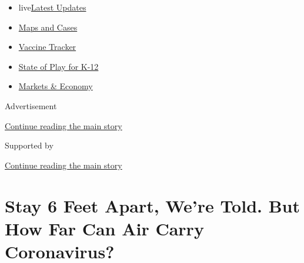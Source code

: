 \begin{itemize}
\tightlist
\item
  live\href{https://www.nytimes3xbfgragh.onion/2020/08/17/world/coronavirus-covid.html?name=styln-coronavirus-national\&region=TOP_BANNER\&variant=undefined\&block=storyline_menu_recirc\&action=click\&pgtype=Article\&impression_id=b8d1f791-e0fc-11ea-9f19-cd4e9f07c8c6}{Latest
  Updates}
\item
  \href{https://www.nytimes3xbfgragh.onion/interactive/2020/us/coronavirus-us-cases.html?name=styln-coronavirus-national\&region=TOP_BANNER\&variant=undefined\&block=storyline_menu_recirc\&action=click\&pgtype=Article\&impression_id=b8d1f792-e0fc-11ea-9f19-cd4e9f07c8c6}{Maps
  and Cases}
\item
  \href{https://www.nytimes3xbfgragh.onion/interactive/2020/science/coronavirus-vaccine-tracker.html?name=styln-coronavirus-national\&region=TOP_BANNER\&variant=undefined\&block=storyline_menu_recirc\&action=click\&pgtype=Article\&impression_id=b8d21ea0-e0fc-11ea-9f19-cd4e9f07c8c6}{Vaccine
  Tracker}
\item
  \href{https://www.nytimes3xbfgragh.onion/2020/08/17/us/k-12-schools-reopening.html?name=styln-coronavirus-national\&region=TOP_BANNER\&variant=undefined\&block=storyline_menu_recirc\&action=click\&pgtype=Article\&impression_id=b8d21ea1-e0fc-11ea-9f19-cd4e9f07c8c6}{State
  of Play for K-12}
\item
  \href{https://www.nytimes3xbfgragh.onion/live/2020/08/17/business/stock-market-today-coronavirus?name=styln-coronavirus-national\&region=TOP_BANNER\&variant=undefined\&block=storyline_menu_recirc\&action=click\&pgtype=Article\&impression_id=b8d21ea2-e0fc-11ea-9f19-cd4e9f07c8c6}{Markets
  \& Economy}
\end{itemize}

Advertisement

\protect\hyperlink{after-top}{Continue reading the main story}

Supported by

\protect\hyperlink{after-sponsor}{Continue reading the main story}

\hypertarget{stay-6-feet-apart-were-told-but-how-far-can-air-carry-coronavirus}{%
\section{Stay 6 Feet Apart, We're Told. But How Far Can Air Carry
Coronavirus?}\label{stay-6-feet-apart-were-told-but-how-far-can-air-carry-coronavirus}}

